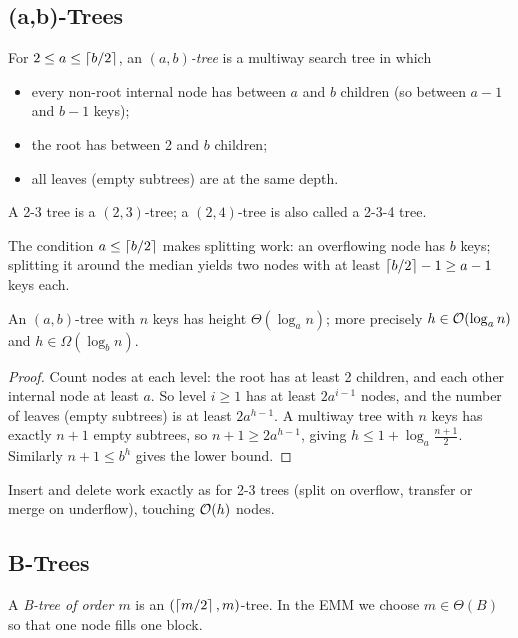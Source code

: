 \subsection{(a,b)-Trees}

\begin{definition}
For $2 \le a \le \left\lceil b/2 \right\rceil$, an \emph{$(a,b)$-tree} is a multiway search tree
in which
\begin{itemize}
  \item every non-root internal node has between $a$ and $b$ children (so
        between $a-1$ and $b-1$ keys);
  \item the root has between 2 and $b$ children;
  \item all leaves (empty subtrees) are at the same depth.
\end{itemize}
A 2-3 tree is a $(2,3)$-tree; a $(2,4)$-tree is also called a 2-3-4 tree.
\end{definition}

The condition $a \le \left\lceil b/2 \right\rceil$ makes splitting work: an overflowing node has
$b$ keys; splitting it around the median yields two nodes with at least
$\left\lceil b/2 \right\rceil - 1 \ge a - 1$ keys each.

\begin{theorem}
An $(a,b)$-tree with $n$ keys has height $\Theta(\log_a n)$; more precisely
$h \in \mathcal{O}(\log_a n)$ and $h \in \Omega(\log_b n)$.
\end{theorem}
\begin{proof}
Count nodes at each level: the root has at least 2 children, and each other
internal node at least $a$. So level $i \ge 1$ has at least $2a^{i-1}$ nodes, and
the number of leaves (empty subtrees) is at least $2a^{h-1}$. A multiway tree
with $n$ keys has exactly $n + 1$ empty subtrees, so $n + 1 \ge 2a^{h-1}$, giving
$h \le 1 + \log_a\frac{n+1}{2}$. Similarly $n + 1 \le b^{h}$ gives the lower bound.
\end{proof}

Insert and delete work exactly as for 2-3 trees (split on overflow, transfer or
merge on underflow), touching $\mathcal{O}(h)$ nodes.

\subsection{B-Trees}

\begin{definition}
A \emph{B-tree of order $m$} is an $(\left\lceil m/2 \right\rceil, m)$-tree. In the EMM we choose
$m \in \Theta(B)$ so that one node fills one block.
\end{definition}

